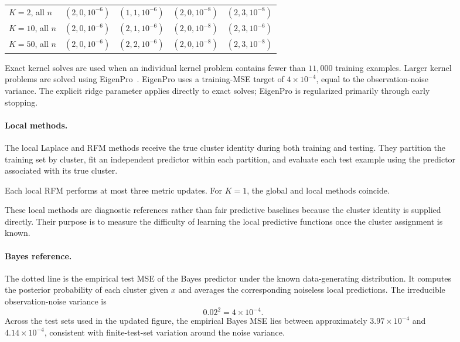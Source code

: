\documentclass{article}
\begin{document}
\begin{figure}
\begin{table}[t]
{\begin{tabular}{@{}lcccc@{}}
\(K=2\), all \(n\)
& \((2,0,10^{-6})\)
& \((1,1,10^{-6})\)
& \((2,0,10^{-8})\)
& \((2,3,10^{-8})\)
\\

\(K=10\), all \(n\)
& \((2,0,10^{-6})\)
& \((2,1,10^{-6})\)
& \((2,0,10^{-8})\)
& \((2,3,10^{-6})\)
\\

\(K=50\), all \(n\)
& \((2,0,10^{-6})\)
& \((2,2,10^{-6})\)
& \((2,0,10^{-8})\)
& \((2,3,10^{-8})\)
\\
\bottomrule
\end{tabular}%
}
\end{table}

Exact kernel solves are used when an individual kernel problem contains fewer
than \(11{,}000\) training examples. Larger kernel problems are solved using
EigenPro~\citep{ma2018power,ma2019kernel,abedsoltan2023toward,
abedsoltan2025fast}. EigenPro uses a training-MSE target of
\(4\times10^{-4}\), equal to the observation-noise variance. The explicit
ridge parameter applies directly to exact solves; EigenPro is regularized
primarily through early stopping.


\paragraph{Local methods.}
The local Laplace and RFM methods receive the true cluster identity
during both training and testing. They partition the training set by cluster,
fit an independent predictor within each partition, and evaluate each test
example using the predictor associated with its true cluster.

Each local RFM  performs at most three metric updates. For \(K=1\), the global
and local methods coincide.

These local methods are diagnostic references rather than fair predictive
baselines because the cluster identity is supplied directly. Their purpose is to
measure the difficulty of learning the local predictive functions once the
cluster assignment is known.


\paragraph{Bayes reference.}
The dotted line is the empirical test MSE of the Bayes predictor under the
known data-generating distribution. It computes the posterior probability of
each cluster given \(x\) and averages the corresponding noiseless local
predictions. The irreducible observation-noise variance is
\[
    0.02^2=4\times10^{-4}.
\]
Across the test sets used in the updated figure, the empirical Bayes MSE lies
between approximately \(3.97\times10^{-4}\) and
\(4.14\times10^{-4}\), consistent with finite-test-set variation around the
noise variance.


\end{figure}
\end{document}
